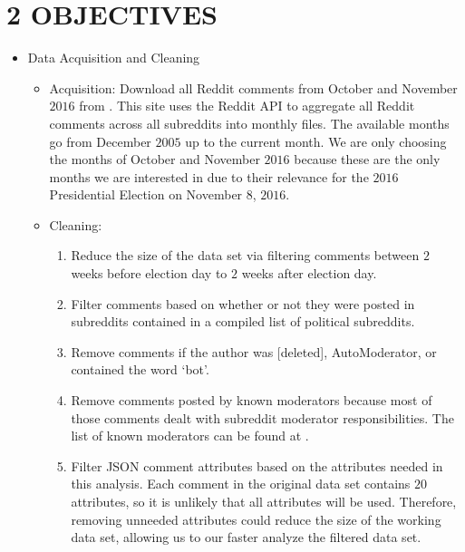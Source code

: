 \documentclass[letterpaper]{article}
\begin{document}

\section{2 OBJECTIVES}
\begin{itemize}
    \item Data Acquisition and Cleaning
    \begin{itemize}
        \item Acquisition: Download all Reddit comments from October and November $2016$ from . This site uses the Reddit API to aggregate all Reddit comments across all subreddits into monthly files. The available months go from December $2005$ up to the current month. We are only choosing the months of October and November $2016$ because these are the only months we are interested in due to their relevance for the $2016$ Presidential Election on November $8$, $2016$.
        \item Cleaning:
            \begin{enumerate}
                \item Reduce the size of the data set via filtering comments between $2$ weeks before election day to $2$ weeks after election day.
                \item Filter comments based on whether or not they were posted in subreddits contained in a compiled list of political subreddits.
                \item Remove comments if the author was  [deleted], AutoModerator, or contained the word `bot'.
                \item Remove comments posted by known moderators because most of those comments dealt with subreddit moderator responsibilities. The list of known moderators can be found at .
                \item Filter JSON comment attributes based on the attributes needed in this analysis. Each comment in the original data set contains $20$ attributes, so it is unlikely that all attributes will be used. Therefore, removing unneeded attributes could reduce the size of the working data set, allowing us to our faster analyze the filtered data set.
            \end{enumerate}
    \end{itemize}
\end{itemize}
\end{document}
